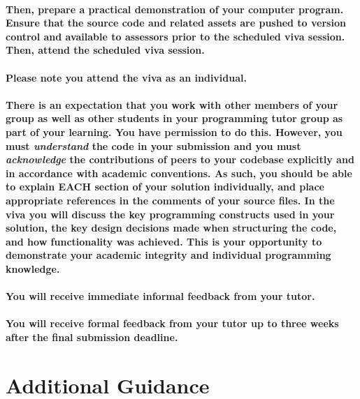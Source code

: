 \documentclass{../../fal_assignment}
\begin{document}
\paragraph{Then, prepare a practical demonstration of your computer program. Ensure that the source code and related assets are pushed to version control and available to assessors prior to the scheduled viva session. Then, attend the scheduled viva session.}

\paragraph{Please note you attend the viva as an individual.}

\paragraph{There is an expectation that you work with other members of your group as well as other students in your programming tutor group as part of your learning. You have permission to do this. However, you must \textit{understand} the code in your submission and you must \textit{acknowledge} the contributions of peers to your codebase explicitly and in accordance with academic conventions. As such, you should be able to explain \textbf{EACH} section of your solution individually, and place appropriate references in the comments of your source files. In the viva you will discuss the key programming constructs used in your solution, the key design decisions made when structuring the code, and how functionality was achieved. This is your opportunity to demonstrate your academic integrity and individual programming knowledge.}

\paragraph{You will receive immediate \textbf{informal feedback} from your \textbf{tutor}.}

\paragraph{You will receive \textbf{formal feedback} from your \textbf{tutor} up to three weeks after the final submission deadline.}

\section*{Additional Guidance}
\end{document}
